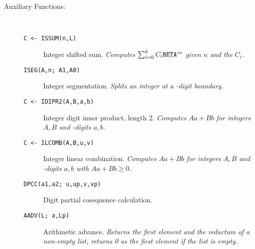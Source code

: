\begin{description}
\item[Auxiliary Functions:] \ \
  \begin{description}
  \item[{\tt C <- ISSUM(n,L) 
}]  Integer shifted sum. {\em Computes $\sum_{i=0}^k C_i
    {\tt BETA}^{in}$ given $n$ and the $C_i$.}
  \item[{\tt  ISEG(A,n; A1,A0) 
}]  Integer segmentation. {\em Splits an integer at a
    \BETA-digit boundary.}
  \item[{\tt C <- IDIPR2(A,B,a,b) 
}]  Integer digit inner product, length 2. {\em Computes $Aa +
    Bb$ for integers $A, B$ and \BETA-digits $a, b$.}
  \item[{\tt C <- ILCOMB(A,B,u,v) 
}]  Integer linear combination. {\em Computes $Aa +
    Bb$ for integers $A, B$ and \BETA-digits $a, b$ with $Aa + Bb \geq 0$.}
  \item[{\tt  DPCC(a1,a2; u,up,v,vp) 
}]  Digit partial cosequence calculation.
  \item[{\tt  AADV(L; a,Lp) 
}]  Arithmetic advance. {\em Returns the first element and the
    reductum of a non-empty list, returns 0 as the first element if the
    list is empty.}
  \end{description}

\end{description}

